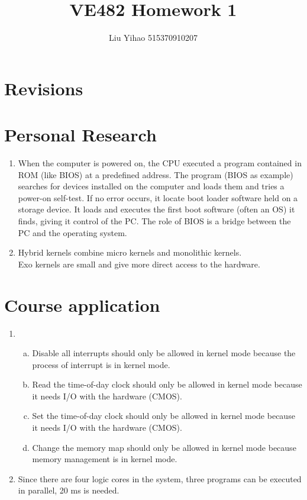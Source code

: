 \documentclass{article}
\title{VE482 Homework 1}
\author{Liu Yihao 515370910207}
\date{}
\begin{document}
\maketitle

\section{Revisions}


\section{Personal Research}
\begin{enumerate}
\item
When the computer is powered on, the CPU executed a program contained in ROM (like BIOS) at a predefined address. The program (BIOS as example) searches for devices installed on the computer and loads them and tries a power-on self-test. If no error occurs, it locate boot loader software held on a storage device. It loads and executes the first boot software (often an OS) it finds, giving it control of the PC. The role of BIOS is a bridge between the PC and the operating system.
\item
Hybrid kernels combine micro kernels and monolithic kernels. \\
Exo kernels are small and give more direct access to the hardware.
\end{enumerate}

\section{Course application}
\begin{enumerate}
\item
\begin{enumerate}[a)]
\item Disable all interrupts should only be allowed in kernel mode because the process of interrupt is in kernel mode.
\item Read the time-of-day clock should only be allowed in kernel mode because it needs I/O with the hardware (CMOS).
\item Set the time-of-day clock should only be allowed in kernel mode because it needs I/O with the hardware (CMOS).
\item Change the memory map should only be allowed in kernel mode because memory management is in kernel mode.
\end{enumerate}
\item Since there are four logic cores in the system, three programs can be executed in parallel, 20 ms is needed.
\end{enumerate}
\end{document}
